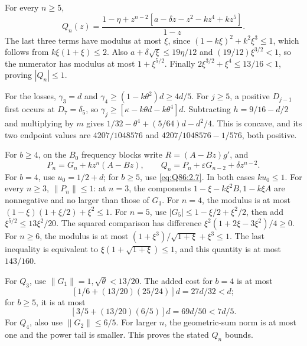 For every \(n\ge\allowbreak 5\),
\[
Q_n(z)=\frac{1-\eta+z^{n-2}[a-\delta z-z^2-kz^4+kz^5]}{1-z}.
\]
The last three terms have modulus at most \(\xi\), since
\((1-k\xi)^2+k^2\xi^3\le\allowbreak 1\), which follows from \(k\xi(1+\xi)\le\allowbreak 2\).
Also \(a+\delta\sqrt\xi\le\allowbreak 19\eta/12\) and
\((19/12)\xi^{3/2}<\allowbreak 1\), so the numerator has modulus at most
\(1+\xi^{5/2}\).
Finally \(2\xi^{3/2}+\xi^4\le\allowbreak 13/16<\allowbreak 1\), proving \(|Q_n|\le\allowbreak 1\).

For the losses, \(\gamma_3=\allowbreak d\) and
\(\gamma_4\ge\allowbreak (1-k\theta^2)d\ge\allowbreak 4d/5\).
For \(j\ge\allowbreak 5\), a positive \(D_{j-1}\) first occurs at \(D_7=\allowbreak \delta_5\), so
\(\gamma_j\ge\allowbreak [\kappa-k\theta d-k\theta^4]d\).
Subtracting \(h=\allowbreak 9/16-d/2\) and multiplying by \(m\) gives
\(1/32-\theta^4+(5/64)d-d^2/4\).
This is concave, and its two endpoint values are
\(4207/1048576\) and \(4207/1048576-1/576\), both positive.

For \(b\ge\allowbreak 4\), on the \(B_0\) frequency blocks write
\(R=\allowbreak (A-Bz)g'\), and
\[
P_n=G_n+kz^n(A-Bz),\qquad
Q_n=P_n+\varepsilon G_{n-2}+\delta z^{n-2}.
\tag{Q86.3.4}\label{eq:Q86:3.4}
\]
For \(b=\allowbreak 4\), use \(u_0=\allowbreak 1/2+d\); for \(b\ge\allowbreak 5\), use
\eqref{eq:Q86:2.7}. In both cases \(ku_0\le\allowbreak 1\).
For every \(n\ge\allowbreak 3\), \(\|P_n\|\le\allowbreak 1\):
at \(n=\allowbreak 3\), the components
\(1-\xi-k\xi^2B,\allowbreak 1-k\xi A\) are nonnegative and no larger than those of \(G_3\).
For \(n=\allowbreak 4\), the modulus is at most
\((1-\xi)(1+\xi/2)+\xi^2\le\allowbreak 1\).
For \(n=\allowbreak 5\), use
\(|G_5|\le\allowbreak 1-\xi/2+\xi^2/2\), then add
\(\xi^{5/2}\le\allowbreak 13\xi^2/20\).
The squared comparison has difference
\(\xi^2(1+2\xi-3\xi^2)/4\ge\allowbreak 0\).
For \(n\ge\allowbreak 6\), the modulus is at most
\((1+\xi^3)/\sqrt{1+\xi}+\xi^3\le\allowbreak 1\).
The last inequality is equivalent to
\(\xi(1+\sqrt{1+\xi})\le\allowbreak 1\), and this quantity is at most \(143/160\).

For \(Q_3\), use \(\|G_1\|=\allowbreak 1,\allowbreak \sqrt\theta<\allowbreak 13/20\).
The added cost for \(b=4\) is at most
\[
[1/6+(13/20)(25/24)]d=27d/32<d;
\]
for \(b\ge5\), it is at most
\[
[3/5+(13/20)(6/5)]d=69d/50<7d/5.
\]
For \(Q_4\), also use \(\|G_2\|\le\allowbreak 6/5\).
For larger \(n\), the geometric-sum norm is at most one and the power tail is smaller.
This proves the stated \(Q_n\) bounds.

